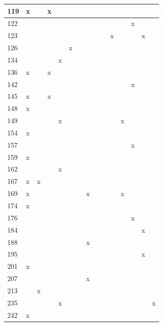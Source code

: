 \begin{landscape}
\begin{longtable}{|p{0.2in}|p{0.3in}|p{0.41in}|p{0.4in}|p{0.3in}|p{0.31in}|p{0.3in}|p{0.3in}|p{0.375in}|p{0.3in}|p{0.3in}|p{0.35in}|p{0.35in}|p{0.4in}|p{0.3in}|}
  119 & x &  & x &  &  &  &  &  &  &  &  &  &  &  \\  \hline
  122 &  &  &  &  &  &  &  &  &  &  &  & x &  &  \\  \hline
   123 &  &  &  &  &  &  &  &  &  & x &  &  & x &  \\  \hline
   126 &  &  &  &  & x &  &  &  &  &  &  &  &  &  \\  \hline
   134 &  &  &  & x &  &  &  &  &  &  &  &  &  &  \\  \hline
   136 & x &  & x &  &  &  &  &  &  &  &  &  &  &  \\  \hline
   142 &  &  &  &  &  &  &  &  &  &  &  & x &  &  \\  \hline
   145 & x &  & x &  &  &  &  &  &  &  &  &  &  &  \\  \hline
   148 & x &  &  &  &  &  &  &  &  &  &  &  &  &  \\  \hline
   149 &  &  &  & x &  &  &  &  &  &  & x &  &  &  \\  \hline
   154 & x &  &  &  &  &  &  &  &  &  &  &  &  &  \\  \hline
   157 &  &  &  &  &  &  &  &  &  &  &  & x &  &  \\  \hline
   159 & x &  &  &  &  &  &  &  &  &  &  &  &  &  \\  \hline
   162 &  &  &  & x &  &  &  &  &  &  &  &  &  &  \\  \hline
   167 & x & x &  &  &  &  &  &  &  &  &  &  &  &  \\  \hline
   169 & x &  &  &  &  &  & x &  &  &  & x &  &  &  \\  \hline
   174 & x &  &  &  &  &  &  &  &  &  &  &  &  &  \\  \hline
   176 &  &  &  &  &  &  &  &  &  &  &  & x &  &  \\  \hline
   184 &  &  &  &  &  &  &  &  &  &  &  &  & x &  \\  \hline
   188 &  &  &  &  &  &  & x &  &  &  &  &  &  &  \\  \hline
   195 &  &  &  &  &  &  &  &  &  &  &  &  & x &  \\  \hline
   201 & x &  &  &  &  &  &  &  &  &  &  &  &  &  \\  \hline
   207 &  &  &  &  &  &  & x &  &  &  &  &  &  &   \\  \hline
   213 &  & x &  &  &  &  &  &  &  &  &  &  &  &  \\  \hline
   235 &  &  &  & x &  &  &  &   &   &   &  &  &  & x \\  \hline
   242 & x &  &  &  &  &  &  &  &  &  &  &  &  &  \\  \hline

\end{longtable}
\end{landscape}
